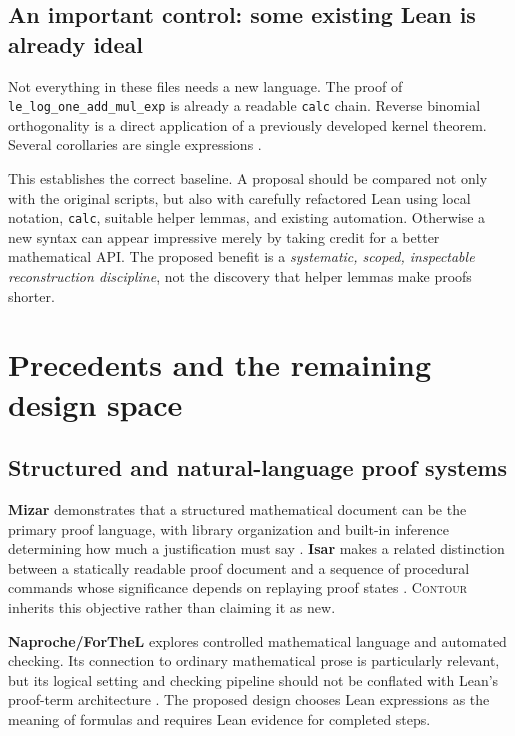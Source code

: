 \documentclass[11pt,a4paper]{article}
\newcommand{\codeid}[1]{\nolinkurl{#1}}
\newcommand{\contour}{\textsc{Contour}}
\begin{document}
\subsection{An important control: some existing Lean is already ideal}

Not everything in these files needs a new language. The proof of \codeid{le_log_one_add_mul_exp} is already a readable \codeid{calc} chain. Reverse binomial orthogonality is a direct application of a previously developed kernel theorem. Several corollaries are single expressions \cite{srclambert,srcbinomial}.

This establishes the correct baseline. A proposal should be compared not only with the original scripts, but also with carefully refactored Lean using local notation, \codeid{calc}, suitable helper lemmas, and existing automation. Otherwise a new syntax can appear impressive merely by taking credit for a better mathematical API. The proposed benefit is a \emph{systematic, scoped, inspectable reconstruction discipline}, not the discovery that helper lemmas make proofs shorter.

\section{Precedents and the remaining design space}

\subsection{Structured and natural-language proof systems}

\textbf{Mizar} demonstrates that a structured mathematical document can be the primary proof language, with library organization and built-in inference determining how much a justification must say \cite{mizar}. \textbf{Isar} makes a related distinction between a statically readable proof document and a sequence of procedural commands whose significance depends on replaying proof states \cite{isar}. \contour{} inherits this objective rather than claiming it as new.

\textbf{Naproche/ForTheL} explores controlled mathematical language and automated checking. Its connection to ordinary mathematical prose is particularly relevant, but its logical setting and checking pipeline should not be conflated with Lean's proof-term architecture \cite{naproche}. The proposed design chooses Lean expressions as the meaning of formulas and requires Lean evidence for completed steps.
\end{document}
